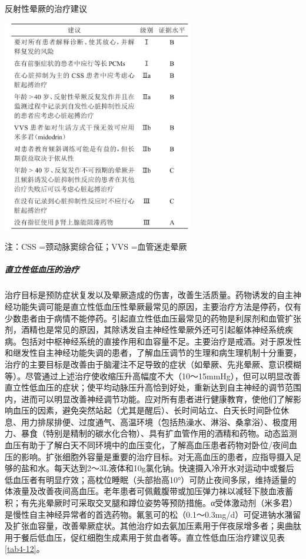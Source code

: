 \begin{table}[htbp]
\centering
\caption{反射性晕厥的治疗建议}
\label{tab4-11}
\includegraphics[width=3.28125in,height=3.66667in]{./images/Image00029.jpg}
\end{table}

注：CSS =颈动脉窦综合征；VVS =血管迷走晕厥

\subparagraph{直立性低血压的治疗}

治疗目标是预防症状复发以及晕厥造成的伤害，改善生活质量。药物诱发的自主神经功能失调可能是直立性低血压性晕厥最常见的原因，主要治疗方法是停药，仅有少数患者由于病情不能停药。引起直立性低血压最常见的药物是利尿剂和血管扩张剂，酒精也是常见的原因，其除诱发自主神经性晕厥外还可引起躯体神经系统疾病。包括对中枢神经系统的直接作用和血容量不足。主要治疗是戒酒。对于原发性和继发性自主神经功能失调的患者，了解血压调节的生理和病生理机制十分重要，治疗的主要目标是改善由于脑灌注不足导致的症状（如晕厥、先兆晕厥、意识模糊等）。尽管通过上述治疗使收缩压升高幅度不大（10～15mmHg），但可以明显改善直立性低血压的症状；使平均动脉压升高恰到好处，重新达到自主神经的调节范围内，进而可以明显改善神经调节功能。应对所有患者进行健康教育，使他们了解影响血压的因素，避免突然站起（尤其是醒后）、长时间站立、白天长时间卧位休息、用力排尿排便、过度通气、高温环境（包括热澡水、淋浴、桑拿浴）、极度用力、暴食（特别是精制的碳水化合物）、具有扩血管作用的酒精和药物。动态监测血压有助于了解白天不同环境中的血压变化，了解高血压患者药物对卧位/夜间血压的影响。扩张细胞外容量是重要的治疗目标。对无高血压的患者，应指导摄入足够的盐和水。每天达到2～3L液体和10g氯化钠。快速摄入冷开水对运动中或餐后低血压者有明显疗效；高枕位睡眠（头部抬高10°）可防止夜间多尿，维持适量的体液量及改善夜间高血压。老年患者可佩戴腹带或加压弹力袜以减轻下肢血液蓄积；有先兆晕厥时可采取交叉腿和蹲位姿势等预防措施。α受体激动剂（米多君）是慢性自主神经异常者的首选药物。氟氢可的松（0.1～0.3mg/d）可促进钠水潴留及扩张血容量，改善晕厥症状。其他治疗如去氨加压素用于伴夜尿增多者；奥曲肽用于餐后低血压，促红细胞生成素用于贫血者等。直立性低血压治疗建议见表\ref{tab4-12}。

